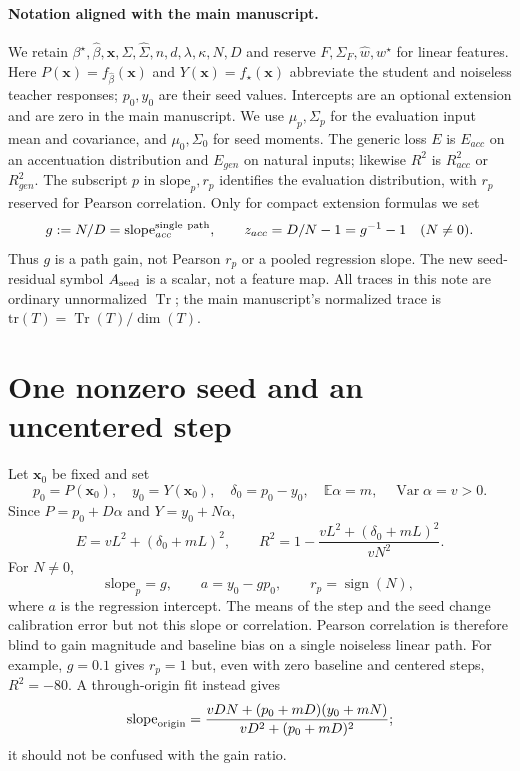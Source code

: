 \documentclass[11pt]{article}
\newcommand{\E}{\mathbb E}
\newcommand{\Var}{\operatorname{Var}}
\newcommand{\Tr}{\operatorname{Tr}}
\newcommand{\bstar}{{\beta^{\star}}}
\newcommand{\bhat}{\hat{\beta}}
\newcommand{\x}{\mathbf{x}}
\begin{document}
\paragraph{Notation aligned with the main manuscript.}
We retain $\bstar,\bhat,\x,\Sigma,\hat\Sigma,n,d,\lambda,\kappa,N,D$
and reserve $F,\Sigma_F,\hat w,w^\star$ for linear features.
Here $P(\x)=f_{\bhat}(\x)$ and $Y(\x)=f_\star(\x)$ abbreviate the
student and noiseless teacher responses; $p_0,y_0$ are their seed values.
Intercepts are an optional extension and are zero in the main manuscript.
We use $\mu_p,\Sigma_p$ for the evaluation input mean and covariance,
and $\mu_0,\Sigma_0$ for seed moments. The generic loss $E$ is
$E_{acc}$ on an accentuation distribution and $E_{gen}$ on natural inputs;
likewise $R^2$ is $R^2_{acc}$ or $R^2_{gen}$. The subscript $p$ in
$\mathrm{slope}_p,r_p$ identifies the evaluation distribution, with $r_p$
reserved for Pearson correlation. Only for compact extension formulas we set
\[
 g:=N/D=\mathrm{slope}_{acc}^{\rm single\ path},\qquad
 z_{acc}=D/N-1=g^{-1}-1\quad(N\ne0).
\]
Thus $g$ is a path gain, not Pearson $r_p$ or a pooled regression slope.
The new seed-residual symbol $A_{\rm seed}$ is a scalar, not a feature map.
All traces in this note are ordinary unnormalized $\Tr$; the main
manuscript's normalized trace is $\mathrm{tr}(T)=\Tr(T)/\dim(T)$.

\section{One nonzero seed and an uncentered step}
Let $\x_0$ be fixed and set
\[
 p_0=P(\x_0),\quad y_0=Y(\x_0),\quad
 \delta_0=p_0-y_0,\quad \E\alpha=m,\quad \Var\alpha=v>0.
\]
Since $P=p_0+D\alpha$ and $Y=y_0+N\alpha$,
\begin{equation}\boxed{
 E=vL^2+(\delta_0+mL)^2,\qquad
 R^2=1-\frac{vL^2+(\delta_0+mL)^2}{vN^2}.}
 \label{eq:single}
\end{equation}
For $N\ne0$,
\begin{equation}\boxed{
 \mathrm{slope}_p=g,\qquad a=y_0-g p_0,\qquad r_p=\operatorname{sign}(N),}
\end{equation}
where $a$ is the regression intercept. The means of the step and the seed
change calibration error but not this slope or correlation. Pearson
correlation is therefore blind to gain magnitude and baseline bias on a
single noiseless linear path. For example, $g=0.1$ gives $r_p=1$ but,
even with zero baseline and centered steps, $R^2=-80$.
A through-origin fit instead gives
\[
 \mathrm{slope}_{\rm origin}=
 \frac{vDN+(p_0+mD)(y_0+mN)}{vD^2+(p_0+mD)^2};
\]
it should not be confused with the gain ratio.
\end{document}
